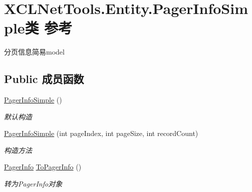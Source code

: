 \hypertarget{class_x_c_l_net_tools_1_1_entity_1_1_pager_info_simple}{\section{X\-C\-L\-Net\-Tools.\-Entity.\-Pager\-Info\-Simple类 参考}
\label{class_x_c_l_net_tools_1_1_entity_1_1_pager_info_simple}
}


分页信息简易model  


\subsection*{Public 成员函数}
\begin{DoxyCompactItemize}
\item 
\hyperlink{class_x_c_l_net_tools_1_1_entity_1_1_pager_info_simple_ad1b150dae6e6ca09d37f0335b9833896}{Pager\-Info\-Simple} ()
\begin{DoxyCompactList}\small\item\em 默认构造 \end{DoxyCompactList}\item 
\hyperlink{class_x_c_l_net_tools_1_1_entity_1_1_pager_info_simple_a76816b7397dbc6df68e1395b28d36f54}{Pager\-Info\-Simple} (int page\-Index, int page\-Size, int record\-Count)
\begin{DoxyCompactList}\small\item\em 构造方法 \end{DoxyCompactList}\item 
\hyperlink{class_x_c_l_net_tools_1_1_entity_1_1_pager_info}{Pager\-Info} \hyperlink{class_x_c_l_net_tools_1_1_entity_1_1_pager_info_simple_aad6bb233e108b30aa4204391dc2393d2}{To\-Pager\-Info} ()
\begin{DoxyCompactList}\small\item\em 转为\-Pager\-Info对象 \end{DoxyCompactList}\end{DoxyCompactItemize}
